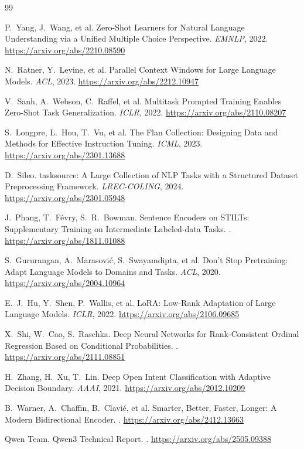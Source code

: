 \begin{thebibliography}{99}
\small

P.~Yang, J.~Wang, et al.
\newblock Zero-Shot Learners for Natural Language Understanding via a Unified
  Multiple Choice Perspective.
\newblock \emph{EMNLP}, 2022. \url{https://arxiv.org/abs/2210.08590}

N.~Ratner, Y.~Levine, et al.
\newblock Parallel Context Windows for Large Language Models.
\newblock \emph{ACL}, 2023. \url{https://arxiv.org/abs/2212.10947}

V.~Sanh, A.~Webson, C.~Raffel, et al.
\newblock Multitask Prompted Training Enables Zero-Shot Task Generalization.
\newblock \emph{ICLR}, 2022. \url{https://arxiv.org/abs/2110.08207}

S.~Longpre, L.~Hou, T.~Vu, et al.
\newblock The Flan Collection: Designing Data and Methods for Effective
  Instruction Tuning.
\newblock \emph{ICML}, 2023. \url{https://arxiv.org/abs/2301.13688}

D.~Sileo.
\newblock tasksource: A Large Collection of NLP Tasks with a Structured Dataset
  Preprocessing Framework.
\newblock \emph{LREC-COLING}, 2024. \url{https://arxiv.org/abs/2301.05948}

J.~Phang, T.~F\'evry, S.~R.~Bowman.
\newblock Sentence Encoders on STILTs: Supplementary Training on Intermediate
  Labeled-data Tasks.
. \url{https://arxiv.org/abs/1811.01088}

S.~Gururangan, A.~Marasovi\'c, S.~Swayamdipta, et al.
\newblock Don't Stop Pretraining: Adapt Language Models to Domains and Tasks.
\newblock \emph{ACL}, 2020. \url{https://arxiv.org/abs/2004.10964}

E.~J.~Hu, Y.~Shen, P.~Wallis, et al.
\newblock LoRA: Low-Rank Adaptation of Large Language Models.
\newblock \emph{ICLR}, 2022. \url{https://arxiv.org/abs/2106.09685}

X.~Shi, W.~Cao, S.~Raschka.
\newblock Deep Neural Networks for Rank-Consistent Ordinal Regression Based on
  Conditional Probabilities.
. \url{https://arxiv.org/abs/2111.08851}

H.~Zhang, H.~Xu, T.~Lin.
\newblock Deep Open Intent Classification with Adaptive Decision Boundary.
\newblock \emph{AAAI}, 2021. \url{https://arxiv.org/abs/2012.10209}

B.~Warner, A.~Chaffin, B.~Clavi\'e, et al.
\newblock Smarter, Better, Faster, Longer: A Modern Bidirectional Encoder.
. \url{https://arxiv.org/abs/2412.13663}

Qwen Team.
\newblock Qwen3 Technical Report.
. \url{https://arxiv.org/abs/2505.09388}

\end{thebibliography}
